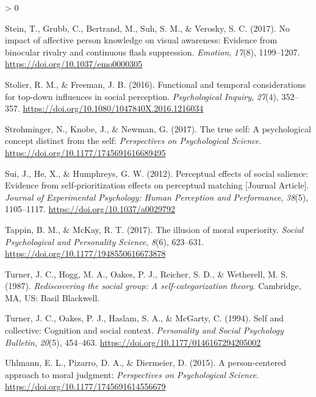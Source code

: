 \documentclass[
  english,
  man]{apa6}
\newlength{\cslhangindent}
\newenvironment{CSLReferences}[2] %
 {%
  \setlength{\parindent}{0pt}
  \ifodd #1 \everypar{\setlength{\hangindent}{\cslhangindent}}\ignorespaces\fi
  \ifnum #2 > 0
  \setlength{\parskip}{#2\baselineskip}
  \fi
 }%
 {}
\begin{document}
\begin{CSLReferences}{1}{0}
\leavevmode\hypertarget{ref-stein_no_2017}{}%
Stein, T., Grubb, C., Bertrand, M., Suh, S. M., \& Verosky, S. C. (2017). No impact of affective person knowledge on visual awareness: Evidence from binocular rivalry and continuous flash suppression. \emph{Emotion}, \emph{17}(8), 1199--1207. \url{https://doi.org/10.1037/emo0000305}

\leavevmode\hypertarget{ref-stolier_functional_2016}{}%
Stolier, R. M., \& Freeman, J. B. (2016). Functional and temporal considerations for top-down influences in social perception. \emph{Psychological Inquiry}, \emph{27}(4), 352--357. \url{https://doi.org/10.1080/1047840X.2016.1216034}

\leavevmode\hypertarget{ref-strohminger_true_2017}{}%
Strohminger, N., Knobe, J., \& Newman, G. (2017). The true self: A psychological concept distinct from the self: \emph{Perspectives on Psychological Science}. \url{https://doi.org/10.1177/1745691616689495}

\leavevmode\hypertarget{ref-Sui_2012_JEPHPP}{}%
Sui, J., He, X., \& Humphreys, G. W. (2012). Perceptual effects of social salience: Evidence from self-prioritization effects on perceptual matching {[}Journal Article{]}. \emph{Journal of Experimental Psychology: Human Perception and Performance}, \emph{38}(5), 1105--1117. \url{https://doi.org/10.1037/a0029792}

\leavevmode\hypertarget{ref-tappin_illusion_2017}{}%
Tappin, B. M., \& McKay, R. T. (2017). The illusion of moral superiority. \emph{Social Psychological and Personality Science}, \emph{8}(6), 623--631. \url{https://doi.org/10.1177/1948550616673878}

\leavevmode\hypertarget{ref-turner_rediscovering_1987}{}%
Turner, J. C., Hogg, M. A., Oakes, P. J., Reicher, S. D., \& Wetherell, M. S. (1987). \emph{Rediscovering the social group: A self-categorization theory}. Cambridge, {MA}, {US}: Basil Blackwell.

\leavevmode\hypertarget{ref-turner_self_1994}{}%
Turner, J. C., Oakes, P. J., Haslam, S. A., \& McGarty, C. (1994). Self and collective: Cognition and social context. \emph{Personality and Social Psychology Bulletin}, \emph{20}(5), 454--463. \url{https://doi.org/10.1177/0146167294205002}

\leavevmode\hypertarget{ref-uhlmann_person-centered_2015}{}%
Uhlmann, E. L., Pizarro, D. A., \& Diermeier, D. (2015). A person-centered approach to moral judgment: \emph{Perspectives on Psychological Science}. \url{https://doi.org/10.1177/1745691614556679}


\end{CSLReferences}
\end{document}
